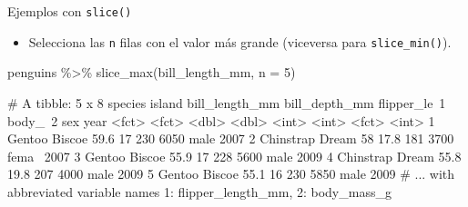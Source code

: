 \documentclass[
  ignorenonframetext,
  aspectratio=169]{beamer}
\newenvironment{Shaded}{\begin{snugshade}}{\end{snugshade}}
\newcommand{\AttributeTok}[1]{\textcolor[rgb]{0.77,0.63,0.00}{#1}}
\newcommand{\DecValTok}[1]{\textcolor[rgb]{0.00,0.00,0.81}{#1}}
\newcommand{\FunctionTok}[1]{\textcolor[rgb]{0.00,0.00,0.00}{#1}}
\newcommand{\NormalTok}[1]{#1}
\newcommand{\SpecialCharTok}[1]{\textcolor[rgb]{0.00,0.00,0.00}{#1}}
\providecommand{\tightlist}{%
  \setlength{\itemsep}{0pt}\setlength{\parskip}{0pt}}
\let\oldverbatim\verbatim
\let\endoldverbatim\endverbatim
\renewenvironment{verbatim}{\tiny\oldverbatim}{\endoldverbatim}
\begin{document}
\begin{frame}[fragile]{Ejemplos con \texttt{slice()}}
\protect\hypertarget{ejemplos-con-slice-3}{}
\begin{itemize}
\tightlist
\item
  Selecciona las \texttt{n} filas con el valor más grande (viceversa
  para \texttt{slice\_min()}).
\end{itemize}

\begin{Shaded}
\begin{Highlighting}[]
\NormalTok{penguins }\SpecialCharTok{\%\textgreater{}\%} 
  \FunctionTok{slice\_max}\NormalTok{(bill\_length\_mm, }\AttributeTok{n =} \DecValTok{5}\NormalTok{)}
\end{Highlighting}
\end{Shaded}

\begin{verbatim}
# A tibble: 5 x 8
  species   island bill_length_mm bill_depth_mm flipper_le~1 body_~2 sex    year
  <fct>     <fct>           <dbl>         <dbl>        <int>   <int> <fct> <int>
1 Gentoo    Biscoe           59.6          17            230    6050 male   2007
2 Chinstrap Dream            58            17.8          181    3700 fema~  2007
3 Gentoo    Biscoe           55.9          17            228    5600 male   2009
4 Chinstrap Dream            55.8          19.8          207    4000 male   2009
5 Gentoo    Biscoe           55.1          16            230    5850 male   2009
# ... with abbreviated variable names 1: flipper_length_mm, 2: body_mass_g
\end{verbatim}
\end{frame}
\end{document}
